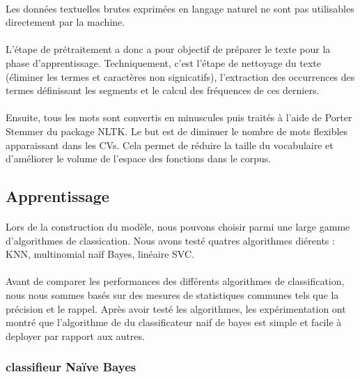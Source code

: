 \documentclass{article}
\begin{document}
\paragraph{}Les données textuelles brutes exprimées en langage naturel ne sont pas utilisables directement
par la machine. 
\paragraph{}L'étape de prétraitement a donc a pour objectif de préparer le texte pour la
phase d'apprentissage. Techniquement, c'est l'étape de nettoyage du texte (éliminer les termes
et caractères non signicatifs), l'extraction des occurrences des termes définissant les segments
et le calcul des fréquences de ces derniers.

\paragraph{} Ensuite, tous les mots sont convertis en minuscules puis traités à l'aide de Porter Stemmer du package NLTK. Le but est de diminuer le nombre de mots flexibles apparaissant dans les CVs. Cela permet de réduire la taille du vocabulaire et d'améliorer le volume de l'espace des fonctions dans le corpus.

\subsection{Apprentissage}

\paragraph{}Lors de la construction du modèle, nous pouvons choisir parmi une large gamme d'algorithmes
de classication. Nous avons testé quatres algorithmes diérents : KNN, multinomial naïf Bayes,
linéaire SVC.
\paragraph{}Avant de comparer les performances des différents algorithmes de classification, nous nous
sommes basés sur des mesures de statistiques communes tels que la précision et le rappel.
Après avoir testé les algorithmes, les expérimentation ont montré que l'algorithme de du classificateur naif de bayes est simple et facile à deployer par rapport aux autres.

\subsubsection{classifieur Naïve Bayes}
\end{document}
